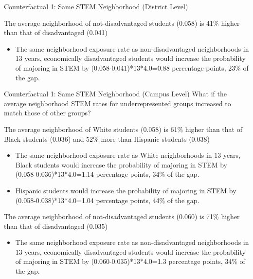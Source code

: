\documentclass[aspectratio=169,xcolor=dvipsnames]{beamer}
\newenvironment{wideitemize}{\itemize\addtolength{\itemsep}{10pt}}{\enditemize}
\begin{document}
\begin{frame}{Counterfactual 1: Same STEM Neighborhood (District Level)}\label{counterfactual1}

\begin{wideitemize}
   
    \item The average neighborhood of not-disadvantaged students  (0.058) is 41\% higher than that of disadvantaged (0.041)
    \begin{itemize}
        \item The same neighborhood exposure rate as non-disadvantaged neighborhoods in 13 years, economically disadvantaged students would increase the probability of majoring in STEM by (0.058-0.041)*13*4.0=0.88 percentage points, 23\% of the gap.
    \end{itemize}
\end{wideitemize}
\hyperlink{counterfactual1_occ}{}
\hyperlink{counterfactual1_campus}{}
\end{frame}


\begin{frame}{Counterfactual 1: Same STEM Neighborhood (Campus Level)}\label{counterfactual1_campus}
What if the average neighborhood STEM rates for underrepresented groups increased to match those of other groups?
\begin{wideitemize}
    \item The average neighborhood of White students (0.058) is 61\% higher than that of Black students (0.036) and 52\% more than Hispanic students (0.038)
    \begin{itemize}
        \item The same neighborhood exposure rate as White neighborhoods in 13 years, Black students would increase the probability of majoring in STEM by (0.058-0.036)*13*4.0=1.14 percentage points, 34\% of the gap. 
        \item Hispanic students would increase the probability of majoring in STEM by (0.058-0.038)*13*4.0=1.04 percentage points, 44\% of the gap. 
    \end{itemize} 
    \item The average neighborhood of not-disadvantaged students  (0.060) is 71\% higher than that of disadvantaged (0.035)
    \begin{itemize}
        \item The same neighborhood exposure rate as non-disadvantaged neighborhoods in 13 years, economically disadvantaged students would increase the probability of majoring in STEM by (0.060-0.035)*13*4.0=1.3 percentage points, 34\% of the gap.
    \end{itemize}
\end{wideitemize}
\hyperlink{counterfactual1}{}
\end{frame}
\end{document}
